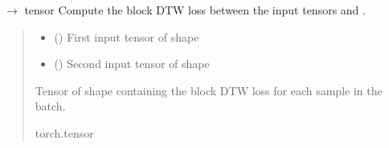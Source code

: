 \documentclass[letterpaper,10pt,english]{sphinxmanual}
\begin{document}
\begin{fulllineitems}
\begin{fulllineitems}
\label{\detokenize{dtw_loss_functions.block_dtw:dtw_loss_functions.block_dtw.block_dtw.forward}}
\pysigstartsignatures
\pysiglinewithargsret
{}
{\sphinxparamcomma {}}
{{ $\rightarrow$ tensor}}
\pysigstopsignatures
\sphinxAtStartPar
Compute the block DTW loss between the input tensors  and .
\begin{quote}\begin{description}
\begin{itemize}
\item {} 
\sphinxAtStartPar
{} () \textendash{} First input tensor of shape 

\item {} 
\sphinxAtStartPar
{} () \textendash{} Second input tensor of shape 

\end{itemize}

\sphinxAtStartPar
{} \textendash{} Tensor of shape  containing the block DTW loss for each sample in the batch.

\sphinxAtStartPar
torch.tensor

\end{description}\end{quote}

\end{fulllineitems}


\end{fulllineitems}

\end{document}
